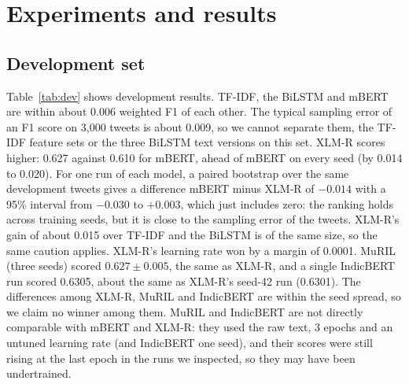 \section{Experiments and results}
\subsection{Development set}
Table~\ref{tab:dev} shows development results. TF-IDF, the BiLSTM and mBERT are within about 0.006 weighted F1 of each
other. The typical sampling error of an F1 score on 3{,}000 tweets is about 0.009, so we cannot separate them, the TF-IDF
feature sets or the three BiLSTM text versions on this set. XLM-R scores higher: 0.627 against 0.610 for mBERT, ahead of
mBERT on every seed (by 0.014 to 0.020). For one run of each model, a paired bootstrap over the same development tweets gives
a difference mBERT minus XLM-R of $-0.014$ with a 95\% interval from $-0.030$ to $+0.003$, which just includes zero: the
ranking holds across training seeds, but it is close to the sampling error of the tweets. XLM-R's gain of about 0.015 over
TF-IDF and the BiLSTM is of the same size, so the same caution applies. XLM-R's learning rate won by a margin of 0.0001. MuRIL (three seeds) scored $0.627 \pm 0.005$, the same as XLM-R, and a single IndicBERT run scored 0.6305, about the same as
XLM-R's seed-42 run (0.6301). The differences among XLM-R, MuRIL and IndicBERT are within the seed spread, so we claim no winner
among them. MuRIL and IndicBERT are not directly comparable with mBERT and XLM-R: they used the raw text, 3 epochs and an untuned
learning rate (and IndicBERT one seed), and their scores were still rising at the last epoch in the runs we inspected, so they
may have been undertrained.

